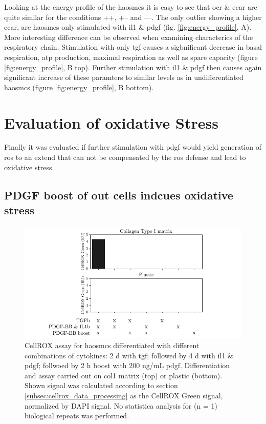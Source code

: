     Looking at the energy profile of the \acp{haosmc} it is easy to see that \ac{ocr} \& \ac{ecar} are quite similar for the conditions ++, +– and ––. The only outlier showing a higher \ac{ecar}, are \acp{haosmc} only stimulated with \ac{il1} \& \ac{pdgf} (fig. \ref{fig:energy_profile}, A). More interesting difference can be observed when examining characterics of the respiratory chain. Stimulation with only \ac{tgf} causes a sigbnificant decrease in basal respiration, \ac{atp} production, maximal respiration as well as spare capacity (figure \ref{fig:energy_profile}, B top). Further stimulation with \ac{il1} \& \ac{pdgf} then causes again significant increase of these paramters to similar levels as in undifferentiated \acp{haosmc} (figure \ref{fig:energy_profile}, B bottom).

\section{Evaluation of oxidative Stress}
\label{sec:oxStress}
Finally it was evaluated if further stimulation with \ac{pdgf} would yield generation of \ac{ros} to an extend that can not be compensated by the \ac{ros} defense and lead to oxidative stress.

    \subsection{PDGF boost of out cells indcues oxidative stress}

    \begin{figure}[h!]
    \capstart
        \centering
    	\includegraphics{Abbildung/CellROX_initial_cond.pdf}

    	\begin{minipage}{\captionwidth}
    		\caption[repeat_Lisa]{ \newline CellROX assay for \acp{haosmc} differentiated with different combinations of cytokines: 2 d with \ac{tgf}; followed by 4 d with \ac{il1} \& \ac{pdgf}; follwoed by 2 h boost with 200 ng/mL \ac{pdgf}. Differentiation and assay carried out on \ac{col1} matrix (top) or plastic (bottom). Shown signal was calculated according to section \ref{subsec:cellrox_data_processing} as the CellROX Green signal, normalized by DAPI signal. No statistica analysis for (n = 1) biological repeats was performed. }
    		\label{fig:cellrox_8con}
    	\end{minipage}
    \end{figure}

